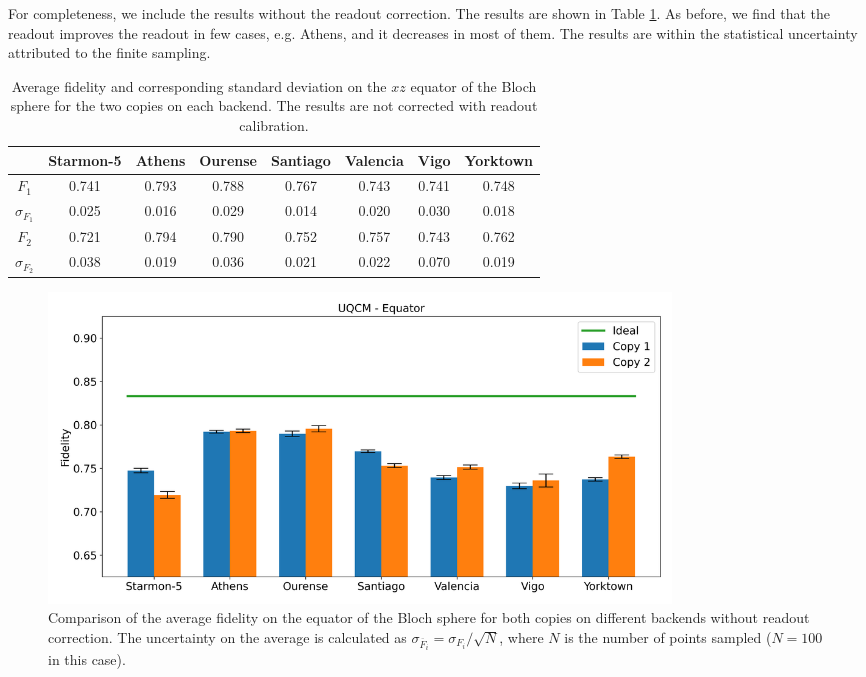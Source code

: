For completeness, we include the results without the readout correction. The results are shown in Table \ref{tab:uqcm_results_eq_non}. As before, we find that the readout improves the readout in few cases, e.g. Athens, and it decreases in most of them. The results are within the statistical uncertainty attributed to the finite sampling.

\begin{table}[H]
    \centering
    \begin{tabular}{|c|c|c|c|c|c|c|c|}
    \hline
    \textbf{} & \textbf{Starmon-5} & \textbf{Athens} & \textbf{Ourense} & \textbf{Santiago} & \textbf{Valencia} & \textbf{Vigo} & \textbf{Yorktown} \\ \hline
    $F_1$              & 0.741 & 0.793 & 0.788 & 0.767 & 0.743 & 0.741 & 0.748\\ \hline
    $\sigma_{F_1}$     & 0.025 & 0.016 & 0.029 & 0.014 & 0.020 & 0.030 & 0.018 \\ \hline
    $F_2$              & 0.721 & 0.794 & 0.790 & 0.752 & 0.757 & 0.743 & 0.762 \\ \hline
    $\sigma_{F_2}$     & 0.038 & 0.019 & 0.036 & 0.021 & 0.022 & 0.070 & 0.019 \\ \hline
    \end{tabular}
    \caption{Average fidelity and corresponding standard deviation on the $xz$ equator of the Bloch sphere for the two copies on each backend. The results are not corrected with readout calibration.}\label{tab:uqcm_results_eq_non}
\end{table}

\begin{figure}[H]
    \centering
            \includegraphics[width=0.8\textwidth]{Figures/UQCM/Histograms/histo_equator_corrected.png}
        
        \caption{Comparison of the average fidelity on the equator of the Bloch sphere for both copies on different backends without readout correction. The uncertainty on the average is calculated as $\sigma_{\overline{F}_i}=\sigma_{F_i}/\sqrt{N}$, where $N$ is the number of points sampled ($N=100$ in this case).}\label{fig:hist_uqcm_equator}
\end{figure}

